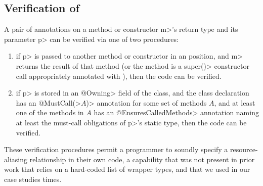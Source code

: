 \subsection{Verification of \mccannot}

A pair of \mccannot annotations on a method or constructor \<m>'s return type
and its parameter \<p> can be verified via one of two
procedures:
\begin{enumerate}
\item if \<p> is passed to another method or constructor in an
  \mccannot position, and \<m> returns the result of that method
  (or the method is a \<super()> constructor call appropriately annotated
  with \mccannot), then the code can be verified.
\item if \<p> is stored in an \<@Owning> field of the class, and the
  class declaration has an \<@MustCall(>$A$\<)> annotation for some set
  of methods $A$, and at least one of the methods in $A$ has an
  \<@EnsuresCalledMethods> annotation naming at least the
  must-call obligations of \<p>'s static type, then the code can be verified.
\end{enumerate}
These verification procedures permit a programmer to soundly specify a resource-aliasing
relationship in their own code, a capability that was not present in prior work
that relies on a hard-coded list of wrapper types, and that we used in our case studies
 times.


